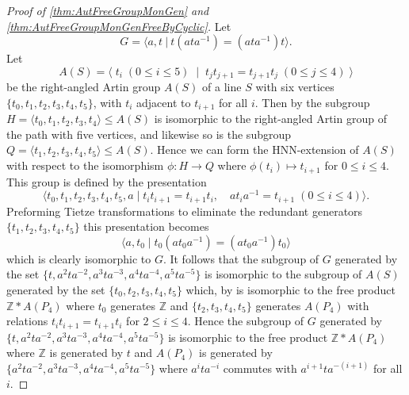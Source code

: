 \documentclass[11pt]{amsart}
\newcommand{\Gpres}[2]{\bigl\langle #1\:|\:#2 \bigr\rangle}
\newcommand{\Z}{\mathbb{Z}}
\theoremstyle{plain}
\theoremstyle{definition}
\begin{document}
\begin{proof}[Proof of \cref{thm:AutFreeGroupMonGen} and \cref{thm:AutFreeGroupMonGenFreeByCyclic}]
Let 
\[
G = \Gpres{a,t}{t(ata^{-1}) = (ata^{-1})t}.
\] 
Let 
\[A(S) = \langle \; t_i \; (0 \leq i \leq 5) \; \mid \; t_j t_{j+1} = t_{j+1} t_j \; (0 \leq j \leq 4) \; \rangle \] 
be the right-angled Artin group $A(S)$ of a line $S$ with six vertices $\{ t_0, t_1, t_2, t_3, t_4, t_5 \}$, with $t_i$ adjacent to $t_{i+1}$ for all $i$.
Then by \cite[Lemma 3.2]{vogtmann2013gl} the subgroup $H = \langle t_0, t_1, t_2, t_3, t_4 \rangle \leq A(S)$ is isomorphic to the right-angled Artin group of the path with five vertices, and likewise so is the subgroup $Q = \langle t_1, t_2, t_3, t_4, t_5 \rangle \leq A(S)$. Hence we can form the HNN-extension of $A(S)$ with respect to the isomorphism $\phi:H \rightarrow Q$ where $\phi(t_i) \mapsto t_{i+1}$ for $0 \leq i \leq 4$. This group is defined by the presentation 
\[ \langle t_0, t_1, t_2, t_3, t_4, t_5, a \mid t_i t_{i+1} = t_{i+1} t_i, \quad a t_i a^{-1} = t_{i+1} \; (0 \leq i \leq 4) \rangle. \]
Preforming Tietze transformations to eliminate the redundant generators $\{ t_1, t_2, t_3, t_4, t_5 \}$ this presentation becomes   
\[ \langle a, t_0 \mid t_0 (at_0a^{-1}) = (at_0a^{-1}) t_0  \rangle \]
which is clearly isomorphic to $G$. It follows that the subgroup of 
$G$ generated by the set $\{ t, a^2 t a^{-2}, a^3 t a^{-3}, a^4 t a^{-4}, a^5 t a^{-5} \}$ is isomorphic to 
the subgroup of $A(S)$ generated by the set $\{t_0, t_2, t_3, t_4, t_5 \}$ which, by \cite[Lemma 3.2]{vogtmann2013gl} is isomorphic to the free product $\Z \ast A(P_4)$ where $t_0$ generates $\Z$ and $\{ t_2, t_3, t_4, t_5 \}$ generates $A(P_4)$ with relations $t_i t_{i+1} = t_{i+1} t_i$ for $2 \leq i \leq 4$.        
Hence the subgroup of $G$ generated by $\{ t, a^2 t a^{-2}, a^3 t a^{-3}, a^4 t a^{-4}, a^5 t a^{-5} \}$ is isomorphic to the free product $\Z \ast A(P_4)$ where $\Z$ is generated by $t$ and $A(P_4)$ is generated by $\{ a^2 t a^{-2}, a^3 t a^{-3}, a^4 t a^{-4}, a^5 t a^{-5} \}$ where $a^i t a^{-i}$ commutes with $a^{i+1} t a^{-{(i+1)}}$ for all $i$.




\end{proof}
\end{document}
